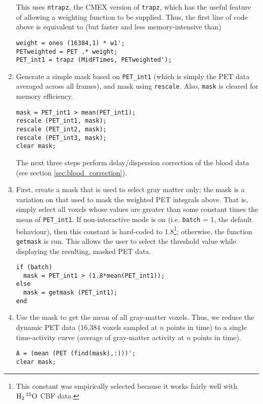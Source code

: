 \documentclass[12pt]{article}
\def\code#1{{\tt #1}}
\begin{document}
\begin{enumerate}
  This uses \code{ntrapz}, the CMEX version of \code{trapz}, which has
  the useful feature of allowing a weighting function to be supplied.
  Thus, the first line of code above is equivalent to (but faster and
  less memory-intensive than)
  \begin{verbatim}
weight = ones (16384,1) * w1';
PETweighted = PET .* weight;
PET_int1 = trapz (MidFTimes, PETweighted');
  \end{verbatim}

\item Generate a simple mask based on \code{PET\_int1} (which is
  simply the PET data averaged across all frames), and mask using
  \code{rescale}.  Also, \code{mask} is cleared for memory efficiency.
  \begin{verbatim}
mask = PET_int1 > mean(PET_int1);
rescale (PET_int1, mask);
rescale (PET_int2, mask);
rescale (PET_int3, mask);
clear mask;
  \end{verbatim}

  The next three steps perform delay/dispersion correction of the
  blood data (see section \ref{sec:blood_correction}).  


\item First, create a mask that is used to select gray matter only;
  the mask is a variation on that used to mask the weighted PET
  integrals above.  That is, simply select all voxels whose values are
  greater than some constant times the mean of \code{PET\_int1}.  If
  non-interactive mode is on (i.e.  \code{batch} = 1, the default
  behaviour), then this constant is hard-coded to 1.8\footnote{This
    constant was empirically selected because it works fairly well
    with ${\rm H_{2}\,^{15}O}$ CBF data.}; otherwise, the function
  \code{getmask} is run.  This allows the user to select the threshold
  value while displaying the resulting, masked PET data.
  \begin{verbatim}
if (batch)
  mask = PET_int1 > (1.8*mean(PET_int1));
else
  mask = getmask (PET_int1);
end
  \end{verbatim}

\item Use the mask to get the mean of all gray-matter voxels.
  Thus, we reduce the dynamic PET data (16,384 voxels sampled at
  $n$ points in time) to a single time-activity curve (average of
  gray-matter activity at $n$ points in time).
  \begin{verbatim}
A = (mean (PET (find(mask),:)))';
clear mask;
  \end{verbatim}


\end{enumerate}
\end{document}
